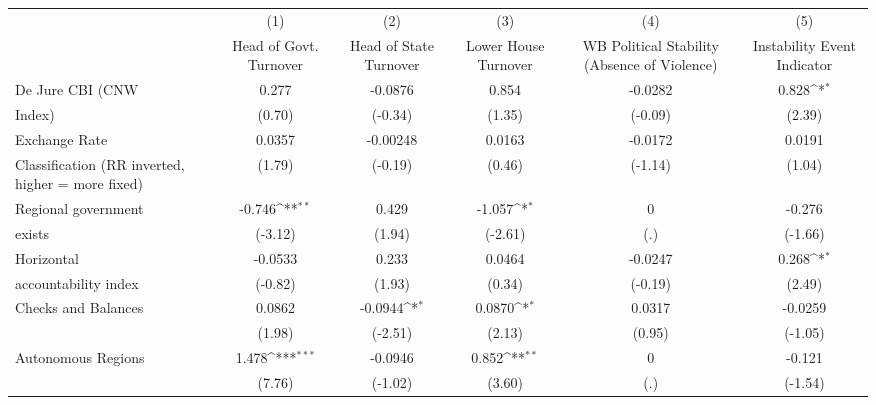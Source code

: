 {
\def\sym#1{\ifmmode^{#1}\else\(^{#1}\)\fi}
\begin{tabular}{l*{5}{c}}
\hline\hline
                    &\multicolumn{1}{c}{(1)}&\multicolumn{1}{c}{(2)}&\multicolumn{1}{c}{(3)}&\multicolumn{1}{c}{(4)}&\multicolumn{1}{c}{(5)}\\
                    &\multicolumn{1}{c}{Head of Govt. Turnover}&\multicolumn{1}{c}{Head of State Turnover}&\multicolumn{1}{c}{Lower House Turnover}&\multicolumn{1}{c}{WB Political Stability (Absence of Violence)}&\multicolumn{1}{c}{Instability Event Indicator}\\
\hline
De Jure CBI (CNW    &       0.277         &     -0.0876         &       0.854         &     -0.0282         &       0.828\sym{*}  \\
Index)              &      (0.70)         &     (-0.34)         &      (1.35)         &     (-0.09)         &      (2.39)         \\
[1em]
Exchange Rate       &      0.0357         &    -0.00248         &      0.0163         &     -0.0172         &      0.0191         \\
Classification (RR inverted, higher = more fixed)&      (1.79)         &     (-0.19)         &      (0.46)         &     (-1.14)         &      (1.04)         \\
[1em]
Regional government &      -0.746\sym{**} &       0.429         &      -1.057\sym{*}  &           0         &      -0.276         \\
exists              &     (-3.12)         &      (1.94)         &     (-2.61)         &         (.)         &     (-1.66)         \\
[1em]
Horizontal          &     -0.0533         &       0.233         &      0.0464         &     -0.0247         &       0.268\sym{*}  \\
accountability index&     (-0.82)         &      (1.93)         &      (0.34)         &     (-0.19)         &      (2.49)         \\
[1em]
Checks and Balances &      0.0862         &     -0.0944\sym{*}  &      0.0870\sym{*}  &      0.0317         &     -0.0259         \\
                    &      (1.98)         &     (-2.51)         &      (2.13)         &      (0.95)         &     (-1.05)         \\
[1em]
Autonomous Regions  &       1.478\sym{***}&     -0.0946         &       0.852\sym{**} &           0         &      -0.121         \\
                    &      (7.76)         &     (-1.02)         &      (3.60)         &         (.)         &     (-1.54)         \\

\end{tabular}}

